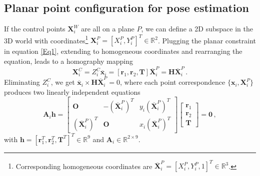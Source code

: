 \documentclass[letterpaper, 10 pt, conference]{ieeeconf}  %
\begin{document}
	\subsection{Planar point configuration for pose estimation}
	
	If the control points $\mathbf{X}_i^{W}$ are all on a plane $P$, we can define a 
	2D subspace in the 3D world with 
	coordinates\footnote{Corresponding homogeneous coordinates are 
		$\overline{\mathbf{X}}_i^{P} = [X_i^P, Y_i^P, 1]^T \in \mathbb{R}^3$.} 
	$\mathbf{X}_i^{P} = [X_i^P, Y_i^P]^T \in \mathbb{R}^2$.
	Plugging the planar constraint in equation \eqref{Eq1}, extending to homogeneous coordinates and rearranging the equation, leads to a homography mapping
	\begin{equation}
	\mathbf{X}_i^{C} = Z_i^C\overline{\mathbf{x}}_i = \left[\mathbf{r}_1, \mathbf{r}_2, \mathbf{T} \right]\overline{\mathbf{X}}_i^{P}
	= \mathbf{H}\overline{\mathbf{X}}_i^{P}\,.
	\end{equation}
	Eliminating $Z_i^C$, we get $\overline{\mathbf{x}}_i \times \mathbf{H}\overline{\mathbf{X}}_i^{P} = 0$, where
	each point correspondence $\{\mathbf{x}_i, \mathbf{X}_i^P\}$ produces two linearly independent equations
	\begin{equation}
	\mathbf{A}_i\mathbf{h} = 
	\begin{bmatrix}
	\mathbf{O} & -(\overline{\mathbf{X}}_i^P)^T & y_i(\overline{\mathbf{X}}_i^P)^T \\
	(\overline{\mathbf{X}}_i^P)^T & \mathbf{O} & x_i(\overline{\mathbf{X}}_i^P)^T 
	\end{bmatrix}
	\begin{bmatrix}
	\mathbf{r}_1 \\
	\mathbf{r}_2 \\
	\mathbf{T}
	\end{bmatrix}
	=\mathbf{0}\, ,
	\end{equation}
	with $\mathbf{h}=[\mathbf{r}_1^T, \mathbf{r}_2^T, \mathbf{T}^T]^T \in \mathbb{R}^{9}$ and $\mathbf{A}_i \in \mathbb{R}^{2 \times 9}$.
	
\end{document}
